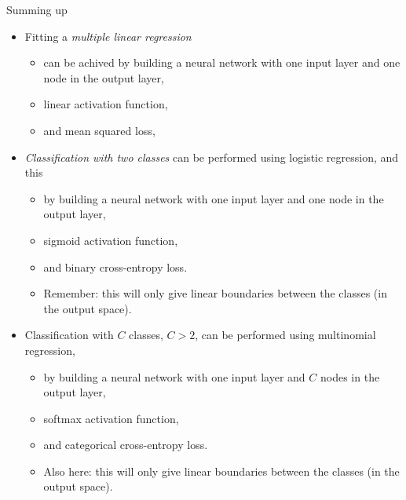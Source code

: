 \documentclass[10pt,ignorenonframetext,]{beamer}
\providecommand{\tightlist}{%
  \setlength{\itemsep}{0pt}\setlength{\parskip}{0pt}}
\begin{document}
\begin{frame}

\begin{block}{Summing up}

\begin{itemize}
\tightlist
\item
  Fitting a \emph{multiple linear regression}

  \begin{itemize}
  \tightlist
  \item
    can be achived by building a neural network with one input layer and
    one node in the output layer,
  \item
    linear activation function,
  \item
    and mean squared loss,
  \end{itemize}
\item
  \emph{Classification with two classes} can be performed using logistic
  regression, and this

  \begin{itemize}
  \tightlist
  \item
    by building a neural network with one input layer and one node in
    the output layer,
  \item
    sigmoid activation function,
  \item
    and binary cross-entropy loss.
  \item
    Remember: this will only give linear boundaries between the classes
    (in the output space).
  \end{itemize}
\end{itemize}

\end{block}

\end{frame}

\begin{frame}

\begin{itemize}
\tightlist
\item
  Classification with \(C\) classes, \(C>2\), can be performed using
  multinomial regression,

  \begin{itemize}
  \tightlist
  \item
    by building a neural network with one input layer and \(C\) nodes in
    the output layer,
  \item
    softmax activation function,
  \item
    and categorical cross-entropy loss.
  \item
    Also here: this will only give linear boundaries between the classes
    (in the output space).
  \end{itemize}
\end{itemize}

\end{frame}
\end{document}
